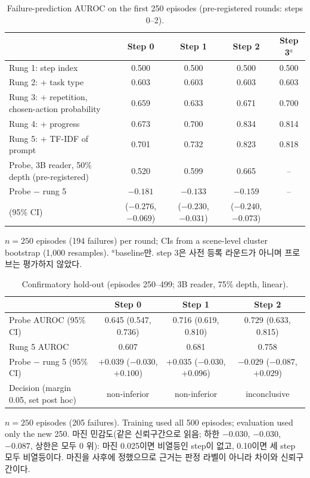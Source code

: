 \documentclass[11pt]{article}
\begin{document}
\begin{table}[t]
\centering\small
\caption{Failure-prediction AUROC on the first 250 episodes (pre-registered rounds: steps 0--2).}\label{tab:ladder}
\begin{tabularx}{\linewidth}{@{}Lcccc@{}}
\toprule
 & Step 0 & Step 1 & Step 2 & Step 3$^{a}$ \\
\midrule
Rung 1: step index & 0.500 & 0.500 & 0.500 & 0.500 \\
Rung 2: + task type & 0.603 & 0.603 & 0.603 & 0.603 \\
Rung 3: + repetition, chosen-action probability & 0.659 & 0.633 & 0.671 & 0.700 \\
Rung 4: + progress & 0.673 & 0.700 & 0.834 & 0.814 \\
Rung 5: + TF-IDF of prompt & 0.701 & 0.732 & 0.823 & 0.818 \\
Probe, 3B reader, 50\% depth (pre-registered) & 0.520 & 0.599 & 0.665 & -- \\
\addlinespace
Probe $-$ rung 5 & $-0.181$ & $-0.133$ & $-0.159$ & -- \\
\quad (95\% CI) & ($-0.276$, $-0.069$) & ($-0.230$, $-0.031$) & ($-0.240$, $-0.073$) & \\
\bottomrule
\end{tabularx}
\par\smallskip\raggedright\footnotesize
$n = 250$ episodes (194 failures) per round; CIs from a scene-level cluster bootstrap (1,000 resamples). $^{a}$baseline만. step 3은 사전 등록 라운드가 아니며 프로브는 평가하지 않았다.
\end{table}

\begin{table}[t]
\centering\small
\caption{Confirmatory hold-out (episodes 250--499; 3B reader, 75\% depth, linear).}\label{tab:confirm}
\begin{tabularx}{\linewidth}{@{}Lccc@{}}
\toprule
 & Step 0 & Step 1 & Step 2 \\
\midrule
Probe AUROC (95\% CI) & 0.645 (0.547, 0.736) & 0.716 (0.619, 0.810) & 0.729 (0.633, 0.815) \\
Rung 5 AUROC & 0.607 & 0.681 & 0.758 \\
Probe $-$ rung 5 (95\% CI) & $+0.039$ ($-0.030$, $+0.100$) & $+0.035$ ($-0.030$, $+0.096$) & $-0.029$ ($-0.087$, $+0.029$) \\
Decision (margin 0.05, set post hoc) & non-inferior & non-inferior & inconclusive \\
\bottomrule
\end{tabularx}
\par\smallskip\raggedright\footnotesize
$n = 250$ episodes (205 failures). Training used all 500 episodes; evaluation used only the new 250. 마진 민감도(같은 신뢰구간으로 읽음; 하한 $-0.030$, $-0.030$, $-0.087$, 상한은 모두 0 위): 마진 0.025이면 비열등인 step이 없고, 0.10이면 세 step 모두 비열등이다. 마진을 사후에 정했으므로 근거는 판정 라벨이 아니라 차이와 신뢰구간이다.
\end{table}
\end{document}
